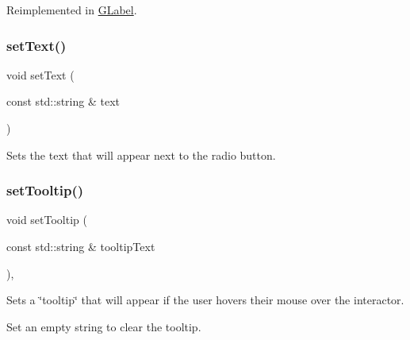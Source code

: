 Reimplemented in \mbox{\hyperlink{classsgl_1_1GLabel_a42d96e60c62d7770993327d7147d77b8}{G\+Label}}.

\mbox{\label{classsgl_1_1GRadioButton_ac1ae51949d41ee9054634be5967d91b8}} 
\subsubsection{\texorpdfstring{set\+Text()}{setText()}}
{\footnotesize\ttfamily void set\+Text (\begin{DoxyParamCaption}\item[{const std\+::string \&}]{text }\end{DoxyParamCaption})\hspace{0.3cm}{\ttfamily [virtual]}}



Sets the text that will appear next to the radio button. 

\mbox{\label{classsgl_1_1GInteractor_a039e0e49beaecc275efce02d416acea8}} 
\subsubsection{\texorpdfstring{set\+Tooltip()}{setTooltip()}}
{\footnotesize\ttfamily void set\+Tooltip (\begin{DoxyParamCaption}\item[{const std\+::string \&}]{tooltip\+Text }\end{DoxyParamCaption})\hspace{0.3cm}{\ttfamily [virtual]}, {\ttfamily [inherited]}}



Sets a \char`\"{}tooltip\char`\"{} that will appear if the user hovers their mouse over the interactor. 

Set an empty string to clear the tooltip. \mbox{\label{classsgl_1_1GInteractor_a18e44e30b31525a243960ca3928125aa}} 
